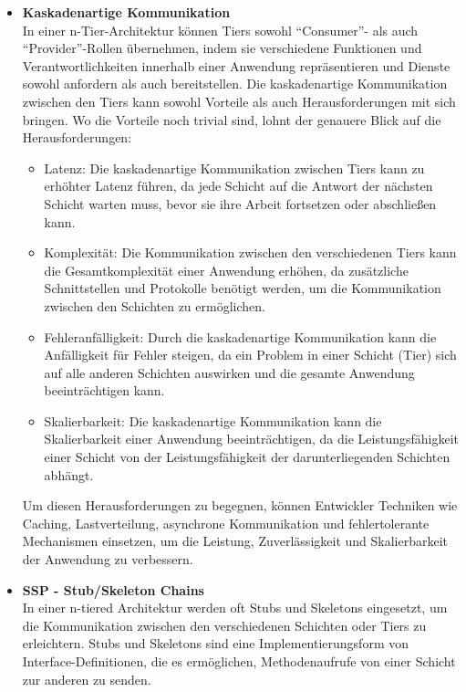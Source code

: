 \documentclass[../vs-script-first-v01.tex]{subfiles}
\begin{document}
\begin{itemize}
\item \textbf{Kaskadenartige Kommunikation}\\
In einer n-Tier-Architektur können Tiers sowohl \enquote{Consumer}- als auch \enquote{Provider}-Rollen übernehmen, indem sie verschiedene Funktionen und Verantwortlichkeiten innerhalb einer Anwendung repräsentieren und Dienste sowohl anfordern als auch bereitstellen. Die kaskadenartige Kommunikation zwischen den Tiers kann sowohl Vorteile als auch Herausforderungen mit sich bringen. Wo die Vorteile noch trivial sind, lohnt der genauere Blick auf die Herausforderungen: 
\begin{itemize}
\item Latenz: Die kaskadenartige Kommunikation zwischen Tiers kann zu erhöhter Latenz führen, da jede Schicht auf die Antwort der nächsten Schicht warten muss, bevor sie ihre Arbeit fortsetzen oder abschließen kann.
\item Komplexität: Die Kommunikation zwischen den verschiedenen Tiers kann die Gesamtkomplexität einer Anwendung erhöhen, da zusätzliche Schnittstellen und Protokolle benötigt werden, um die Kommunikation zwischen den Schichten zu ermöglichen.
\item Fehleranfälligkeit: Durch die kaskadenartige Kommunikation kann die Anfälligkeit für Fehler steigen, da ein Problem in einer Schicht (Tier) sich auf alle anderen Schichten auswirken und die gesamte Anwendung beeinträchtigen kann.
\item Skalierbarkeit: Die kaskadenartige Kommunikation kann die Skalierbarkeit einer Anwendung beeinträchtigen, da die Leistungsfähigkeit einer Schicht von der Leistungsfähigkeit der darunterliegenden Schichten abhängt.
\end{itemize}
Um diesen Herausforderungen zu begegnen, können Entwickler Techniken wie Caching, Lastverteilung, asynchrone Kommunikation und fehlertolerante Mechanismen einsetzen, um die Leistung, Zuverlässigkeit und Skalierbarkeit der Anwendung zu verbessern.
\item \textbf{SSP - Stub/Skeleton Chains}\\
In einer n-tiered Architektur werden oft Stubs und Skeletons eingesetzt, um die Kommunikation zwischen den verschiedenen Schichten oder Tiers zu erleichtern. Stubs und Skeletons sind eine Implementierungsform von Interface-Definitionen, die es ermöglichen, Methodenaufrufe von einer Schicht zur anderen zu senden.


\end{itemize}
\end{document}
